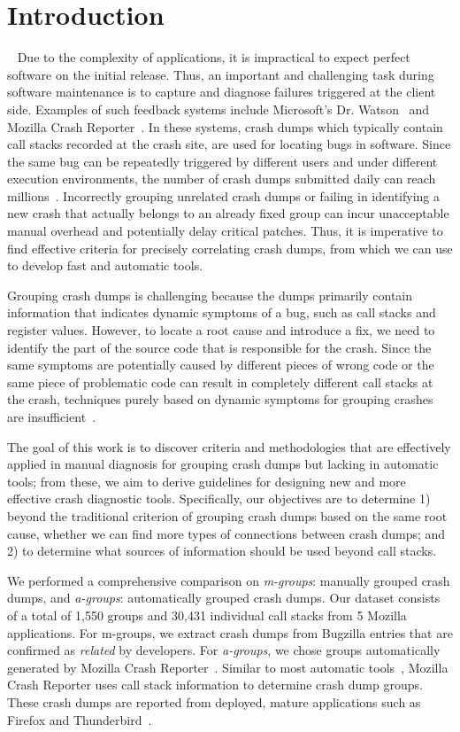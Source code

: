 \documentclass{llncs}
\begin{document}
\section{Introduction}~\label{sec:intro}
Due to the complexity of applications, it is impractical to expect perfect software on the initial release. Thus, an important and challenging task during software maintenance is to capture and diagnose failures triggered at the client side. Examples of such feedback systems include Microsoft's Dr. Watson~\cite{watson} and Mozilla Crash Reporter~\cite{mozilla}. In these systems, crash dumps which typically contain call stacks recorded at the crash site, are used for locating bugs in software. Since the same bug can be repeatedly triggered by different users and under different execution environments, the number of crash dumps submitted daily can reach millions~\cite{firefox}. Incorrectly grouping unrelated crash dumps or failing in identifying a new crash that actually belongs to an already fixed group can incur unacceptable manual overhead and potentially delay critical patches. Thus, it is imperative to find effective criteria for precisely correlating crash dumps, from which we can use to develop fast and automatic tools.

Grouping crash dumps is challenging because the dumps primarily contain information that indicates dynamic symptoms of a bug, such as call stacks and register values. However, to locate a root cause and introduce a fix, we need to identify the part of the source code that is responsible for the crash. Since the same symptoms are potentially caused by different pieces of wrong code or the same piece of problematic code can result in completely different call stacks at the crash, techniques purely based on dynamic symptoms for grouping crashes are insufficient~\cite{Bartz:2008:FSF:1855895.1855896,brodie:automated,4401026,Kim:2011:2}.

The goal of this work is to discover criteria and methodologies that are effectively applied in manual diagnosis for grouping crash dumps but lacking in automatic tools; from these, we aim to derive guidelines for designing new and more effective crash diagnostic tools. Specifically, our objectives are to determine 1) beyond the traditional criterion of grouping crash dumps based on the same root cause, whether we can find more types of connections between crash dumps; and 2) to determine what sources of information should be used beyond call stacks.

We performed a comprehensive comparison on {\it m-groups}: manually grouped crash dumps, and {\it a-groups}: automatically grouped crash dumps. Our dataset consists of a total of 1,550 groups and 30,431 individual call stacks from 5 Mozilla applications. For m-groups, we extract crash dumps from Bugzilla entries that are confirmed as {\it related} by developers. For {\it a-groups}, we chose groups automatically generated by Mozilla Crash Reporter~\cite{mozilla}. Similar to most automatic tools~\cite{Bartz:2008:FSF:1855895.1855896,brodie:automated,4401026}, Mozilla Crash Reporter uses call stack information to determine crash dump groups. These crash dumps are reported from deployed, mature applications such as Firefox and Thunderbird~\cite{firefox}.
\end{document}
